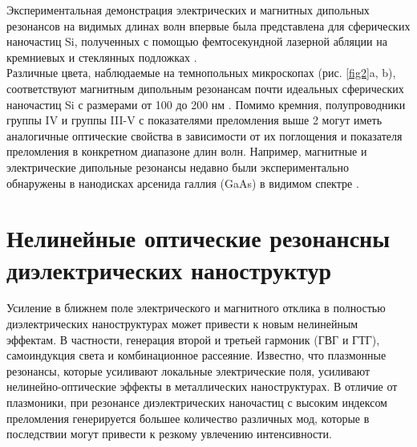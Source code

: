 Экспериментальная демонстрация электрических и магнитных дипольных резонансов на видимых длинах волн впервые была представлена для сферических наночастиц Si, полученных с помощью фемтосекундной лазерной абляции на кремниевых и стеклянных подложках \cite{kuznetsov2012luk}. 
\\
\hspace*{2mm}
Различные цвета, наблюдаемые на темнопольных микроскопах (рис. \ref{fig2}a, b), соответствуют магнитным дипольным резонансам почти идеальных сферических наночастиц Si с размерами от 100 до 200 нм \cite{kuznetsov2012luk}.  Помимо кремния, полупроводники группы IV и группы III-V с показателями преломления выше 2 могут иметь аналогичные оптические свойства в зависимости от их поглощения и показателя преломления в конкретном диапазоне длин волн. Например, магнитные и электрические дипольные резонансы недавно были экспериментально обнаружены в нанодисках арсенида галлия (GaAs) в видимом спектре \cite{person2013demonstration}.


\section{Нелинейные оптические резонансны диэлектрических наноструктур}
\hspace*{2mm}
Усиление в ближнем поле электрического и магнитного отклика в полностью диэлектрических наноструктурах может привести к новым нелинейным эффектам. В частности, генерация второй и третьей гармоник (ГВГ и ГТГ), самоиндукция света и комбинационное рассеяние. Известно, что плазмонные резонансы, которые усиливают локальные электрические поля, усиливают нелинейно-оптические эффекты в металлических наноструктурах. В отличие от плазмоники, при резонансе диэлектрических наночастиц с высоким индексом преломления генерируется большее количество различных мод, которые в последствии могут привести к резкому увлечению интенсивности.

